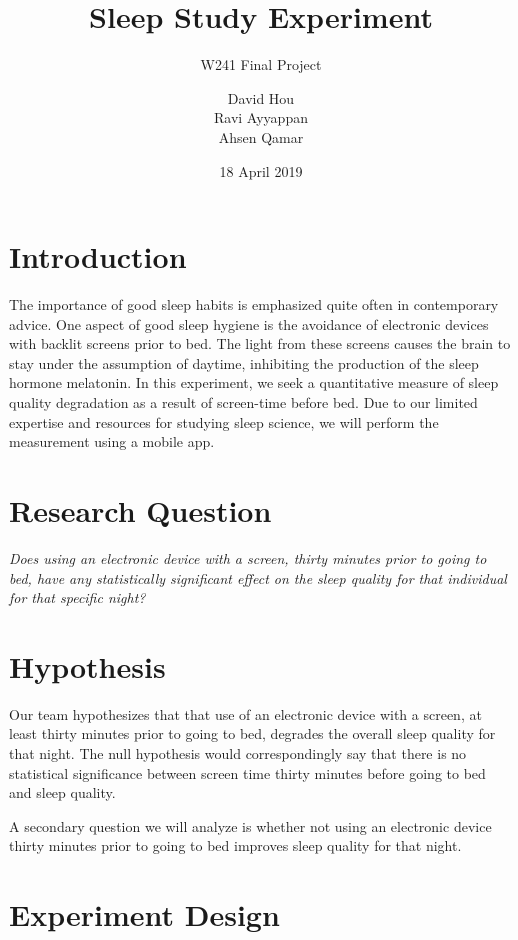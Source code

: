 \documentclass[12pt,]{article}
\title{Sleep Study Experiment}
\subtitle{W241 Final Project}
\author{David Hou \\ Ravi Ayyappan \\ Ahsen Qamar}
\date{18 April 2019}
\begin{document}
\maketitle

\section{Introduction}\label{introduction}

The importance of good sleep habits is emphasized quite often in
contemporary advice. One aspect of good sleep hygiene is the avoidance
of electronic devices with backlit screens prior to bed. The light from
these screens causes the brain to stay under the assumption of daytime,
inhibiting the production of the sleep hormone melatonin. In this
experiment, we seek a quantitative measure of sleep quality degradation
as a result of screen-time before bed. Due to our limited expertise and
resources for studying sleep science, we will perform the measurement
using a mobile app.

\section{Research Question}\label{research-question}

\emph{Does using an electronic device with a screen, thirty minutes
prior to going to bed, have any statistically significant effect on the
sleep quality for that individual for that specific night?}

\section{Hypothesis}\label{hypothesis}

Our team hypothesizes that that use of an electronic device with a
screen, at least thirty minutes prior to going to bed, degrades the
overall sleep quality for that night. The null hypothesis would
correspondingly say that there is no statistical significance between
screen time thirty minutes before going to bed and sleep quality.

A secondary question we will analyze is whether not using an electronic
device thirty minutes prior to going to bed improves sleep quality for
that night.

\section{Experiment Design}\label{experiment-design}
\end{document}
